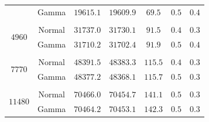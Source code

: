 \documentclass[12pt]{article}
\begin{document}
\begin{table}
\begin{center}
\begin{tabular}{c c c c c c c}
                           & Gamma & $19615.1$ & $19609.9$ & $69.5$ & $0.5$ & $0.4$\\
                  \\
                  \multirow{2}{*}{$4960$} & Normal & $31737.0$ & $31730.1$ & $91.5$ & $0.4$ & $0.3$\\
                           & Gamma & $31710.2$ & $31702.4$ & $91.9$ & $0.5$ & $0.4$\\
                  \\
                  \multirow{2}{*}{$7770$} & Normal & $48391.5$ & $48383.3$ & $115.5$ & $0.4$ & $0.3$\\
                           & Gamma & $48377.2$ & $48368.1$ & $115.7$ & $0.5$ & $0.3$\\
                  \\
                  \multirow{2}{*}{$11480$} & Normal & $70466.0$ & $70454.7$ & $141.1$ & $0.5$ & $0.3$\\
                           & Gamma & $70464.2$ & $70453.1$ & $142.3$ & $0.5$ & $0.3$\\
		\bottomrule
		\end{tabular}
		\label{tb.emp_summary}
	\end{center}	
      \end{table}
\end{document}
